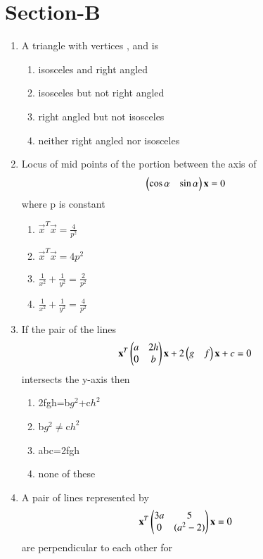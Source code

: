 \section{\LARGE Section-B}
\begin{enumerate}
    \item A triangle with vertices , and  is
    \begin{enumerate}
     \item  isosceles and right angled
     \item  isosceles but not right angled
     \item  right angled but not isosceles
     \item  neither right angled nor isosceles
     \end{enumerate}
    \item Locus of mid points of the portion between the axis of \begin{align}\begin{pmatrix}\cos\alpha & \sin\alpha\end{pmatrix}\mathbf {x} &= 0\end{align} where p is constant
    \begin{enumerate}
     \item  $\vec{x}^T\vec{x} ={\frac{4}{p^2}}$ 
     \item  $\vec{x}^T\vec{x} =4p^2$ 
     \item  ${\frac{1}{x^2}}+{\frac{1}{y^2}}={\frac{2}{p^2}}$
     \item  ${\frac{1}{x^2}}+{\frac{1}{y^2}}={\frac{4}{p^2}}$
     \end{enumerate}
    \item If the pair of the lines \begin{align} \mathbf{x}^T\begin{pmatrix}a & 2h \\ 0 & b\end{pmatrix} \mathbf {x} + 2\begin{pmatrix}g & f\end{pmatrix}\mathbf {x} + c &=0\end{align}  intersects the y-axis then
    \begin{enumerate}
     \item  2fgh=b$g^2$+c$h^2$
     \item  b$g^2\neq$c$h^2$
     \item  abc=2fgh
     \item  none of these
     \end{enumerate}
    \item A pair of lines represented by \begin{align} \mathbf{x}^T\begin{pmatrix}3a & 5 \\ 0 & (a^2-2)\end{pmatrix} \mathbf {x} &=0\end{align} are perpendicular to each other for

\end{enumerate}
